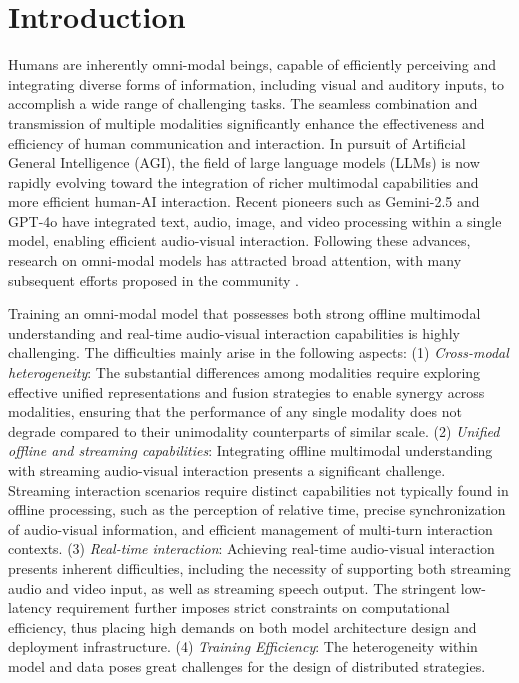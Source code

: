 \documentclass{article}
\begin{document}
\clearpage
\tableofcontents
\clearpage

\section{Introduction} %

Humans are inherently omni-modal beings, capable of efficiently perceiving and integrating diverse forms of information, including visual and auditory inputs, to accomplish a wide range of challenging tasks. The seamless combination and transmission of multiple modalities significantly enhance the effectiveness and efficiency of human communication and interaction. In pursuit of Artificial General Intelligence (AGI), the field of large language models (LLMs) is now rapidly evolving toward the integration of richer multimodal capabilities and more efficient human-AI interaction.
Recent pioneers such as Gemini-2.5 \citep{comanici2025gemini} and GPT-4o \citep{gpt4o} have integrated text, audio, image, and video processing within a single model, enabling efficient audio-visual interaction. Following these advances, research on omni-modal models has attracted broad attention, with many subsequent efforts proposed in the community \citep{xu2025qwen3, guo2025m2, li2025baichuan, liu2025ola, fu2025vita}.

Training an omni-modal model that possesses both strong offline multimodal understanding and real-time audio-visual interaction capabilities is highly challenging. The difficulties mainly arise in the following aspects: (1) \textit{Cross-modal heterogeneity}: The substantial differences among modalities require exploring effective unified representations and fusion strategies to enable synergy across modalities, ensuring that the performance of any single modality does not degrade compared to their unimodality counterparts of similar scale. (2) \textit{Unified offline and streaming capabilities}: Integrating offline multimodal understanding with streaming audio-visual interaction presents a significant challenge. Streaming interaction scenarios require distinct capabilities not typically found in offline processing, such as the perception of relative time, precise synchronization of audio-visual information, and efficient management of multi-turn interaction contexts. (3) \textit{Real-time interaction}: Achieving real-time audio-visual interaction presents inherent difficulties, including the necessity of supporting both streaming audio and video input, as well as streaming speech output. The stringent low-latency requirement further imposes strict constraints on computational efficiency, thus placing high demands on both model architecture design and deployment infrastructure. (4) \textit{Training Efficiency}: The heterogeneity within model and data poses great challenges for the design of distributed strategies.
\end{document}
